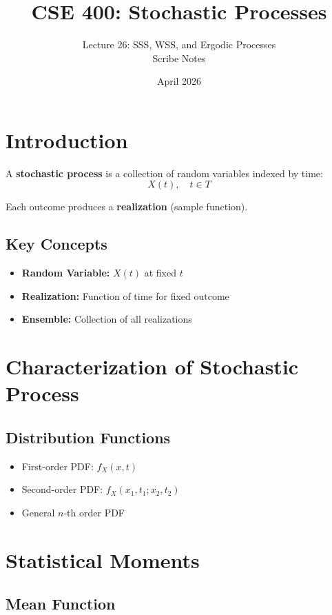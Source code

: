 \documentclass[11pt]{article}
\title{CSE 400: Stochastic Processes}
\author{Lecture 26: SSS, WSS, and Ergodic Processes \\ Scribe Notes}
\date{April 2026}
\begin{document}
\maketitle

\section{Introduction}

A \textbf{stochastic process} is a collection of random variables indexed by time:
\[
X(t), \quad t \in T
\]

Each outcome produces a \textbf{realization} (sample function).

\subsection{Key Concepts}
\begin{itemize}
    \item \textbf{Random Variable:} $X(t)$ at fixed $t$
    \item \textbf{Realization:} Function of time for fixed outcome
    \item \textbf{Ensemble:} Collection of all realizations
\end{itemize}

\section{Characterization of Stochastic Process}

\subsection{Distribution Functions}

\begin{itemize}
    \item First-order PDF: $f_X(x,t)$
    \item Second-order PDF: $f_X(x_1, t_1; x_2, t_2)$
    \item General $n$-th order PDF
\end{itemize}

\section{Statistical Moments}

\subsection{Mean Function}
\end{document}
